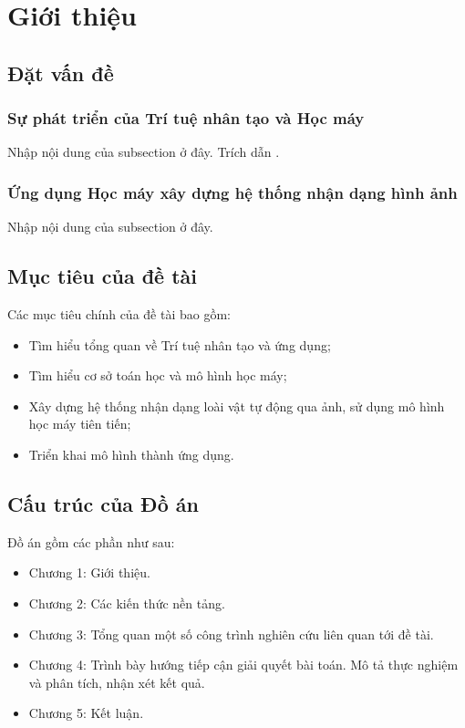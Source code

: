 \chapter {Giới thiệu}\label{chapter_1}
	
\section{Đặt vấn đề}
\subsection{Sự phát triển của Trí tuệ nhân tạo và Học máy}
Nhập nội dung của subsection ở đây.
Trích dẫn \cite{Krizhevsky2012}.
\subsection{Ứng dụng Học máy xây dựng hệ thống nhận dạng hình ảnh}
Nhập nội dung của subsection ở đây.

\section{Mục tiêu của đề tài}

Các mục tiêu chính của đề tài bao gồm:
\begin{itemize}
\item Tìm hiểu tổng quan về Trí tuệ nhân tạo và ứng dụng;
\item Tìm hiểu cơ sở toán học và mô hình học máy;
\item Xây dựng hệ thống nhận dạng loài vật tự động qua ảnh, sử dụng mô hình học máy tiên tiến;
\item Triển khai mô hình thành ứng dụng.
\end{itemize}

\section{Cấu trúc của Đồ án}
Đồ án gồm các phần như sau:
\begin{itemize}
\item Chương 1: Giới thiệu. 
\item Chương 2: Các kiến thức nền tảng.
\item Chương 3: Tổng quan một số công trình nghiên cứu liên quan tới đề tài.
\item Chương 4: Trình bày hướng tiếp cận giải quyết bài toán. Mô tả thực nghiệm và phân tích, nhận xét kết quả.
\item Chương 5: Kết luận.
\end{itemize}